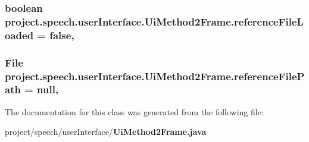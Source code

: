 \subsubsection[{reference\+File\+Loaded}]{\setlength{\rightskip}{0pt plus 5cm}boolean project.\+speech.\+user\+Interface.\+Ui\+Method2\+Frame.\+reference\+File\+Loaded = false\hspace{0.3cm}{\ttfamily [static]}, {\ttfamily [private]}}\label{classproject_1_1speech_1_1user_interface_1_1_ui_method2_frame_aebd83e37e6f62e99049322923985a7bd}
\subsubsection[{reference\+File\+Path}]{\setlength{\rightskip}{0pt plus 5cm}File project.\+speech.\+user\+Interface.\+Ui\+Method2\+Frame.\+reference\+File\+Path = null\hspace{0.3cm}{\ttfamily [static]}, {\ttfamily [private]}}\label{classproject_1_1speech_1_1user_interface_1_1_ui_method2_frame_adb4febf0ccfe74b564282cfeb530e5df}


The documentation for this class was generated from the following file\+:\begin{DoxyCompactItemize}
\item 
project/speech/user\+Interface/{\bf Ui\+Method2\+Frame.\+java}\end{DoxyCompactItemize}
